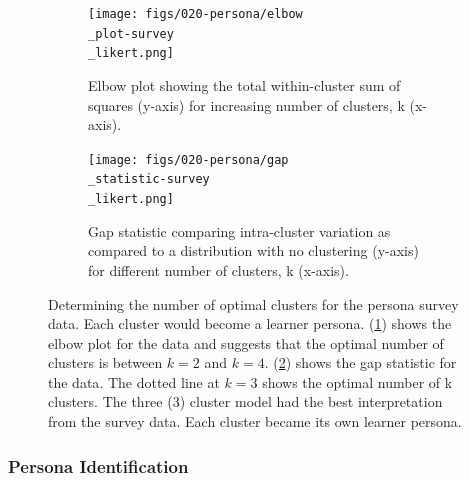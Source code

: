 \documentclass[020-persona\_validation.tex]{subfiles}
\begin{document}
        \begin{figure}[!htbp]
            \centering
            \begin{subfigure}[h]{0.45\textwidth}
                \centering
                \texttt{[image: figs/020-persona/elbow\\\_plot-survey\\\_likert.png]}
                \caption[Elbow plot for determining optimal number of clusters.]
                {Elbow plot showing the total within-cluster sum of squares (y-axis) for increasing number of clusters, k (x-axis).
                }
                \label{sfig:cluster-elbow}
            \end{subfigure}
            \begin{subfigure}[h]{0.45\textwidth}
                \centering
                \texttt{[image: figs/020-persona/gap\\\_statistic-survey\\\_likert.png]}
                \caption[Gap statistic for determining optimal number of clusters.]
                {Gap statistic comparing
                    intra-cluster variation as compared to a distribution with no clustering (y-axis)
                    for different number of clusters, k (x-axis).
                }
                \label{sfig:cluster-gap}
            \end{subfigure}
            \caption[Elbow plot and Gap statistic for optimal number of clusters.]
            {Determining the number of optimal clusters for the persona survey data.
                Each cluster would become a learner persona.
                (\ref{sfig:cluster-elbow}) shows the elbow plot for the data and
                suggests that the optimal number of clusters is between $k=2$ and $k=4$.
                (\ref{sfig:cluster-gap}) shows the gap statistic for the data.
                The dotted line at $k=3$ shows the optimal number of k clusters.
                The three (3) cluster model had the best interpretation from the survey data.
                Each cluster became its own learner persona.
            }
        \label{fig:cluster-gap-elbow}
        \end{figure}

    \subsubsection{Persona Identification}
\end{document}
